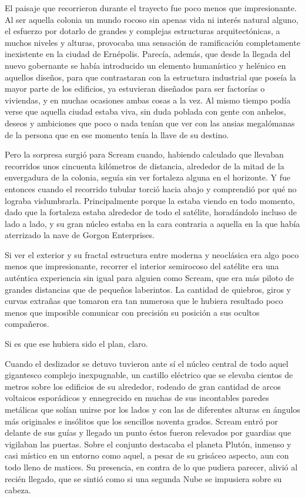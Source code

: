 El paisaje que recorrieron durante el trayecto fue poco menos que impresionante. Al ser aquella colonia un mundo rocoso sin apenas vida ni interés natural alguno, el esfuerzo por dotarlo de grandes y complejas estructuras arquitectónicas, a muchos niveles y alturas, provocaba una sensación de ramificación completamente inexistente en la ciudad de Ernépolis. Parecía, además, que desde la llegada del nuevo gobernante se había introducido un elemento humanístico y helénico en aquellos diseños, para que contrastaran con la estructura industrial que poseía la mayor parte de los edificios, ya estuvieran diseñados para ser factorías o viviendas, y en muchas ocasiones ambas cosas a la vez. Al mismo tiempo podía verse que aquella ciudad estaba viva, sin duda poblada con gente con anhelos, deseos y ambiciones que poco o nada tenían que ver con las ansias megalómanas de la persona que en ese momento tenía la llave de su destino.

Pero la sorpresa surgió para Scream cuando, habiendo calculado que llevaban recorridos unos cincuenta kilómetros de distancia, alrededor de la mitad de la envergadura de la colonia, seguía sin ver fortaleza alguna en el horizonte. Y fue entonces cuando el recorrido tubular torció hacia abajo y comprendió por qué no lograba vislumbrarla. Principalmente porque la estaba viendo en todo momento, dado que la fortaleza estaba alrededor de todo el satélite, horadándolo incluso de lado a lado, y su gran núcleo estaba en la cara contraria a aquella en la que había aterrizado la nave de Gorgon Enterprises.

Si ver el exterior y su fractal estructura entre moderna y neoclásica era algo poco menos que impresionante, recorrer el interior semirocoso del satélite era una auténtica experiencia sin igual para alguien como Scream, que era más piloto de grandes distancias que de pequeños laberintos. La cantidad de quiebros, giros y curvas extrañas que tomaron era tan numerosa que le hubiera resultado poco menos que imposible comunicar con precisión su posición a sus ocultos compañeros.

Si es que ese hubiera sido el plan, claro.

Cuando el deslizador se detuvo tuvieron ante sí el núcleo central de todo aquel gigantesco complejo inexpugnable, un castillo eléctrico que se elevaba cientos de metros sobre los edificios de su alrededor, rodeado de gran cantidad de arcos voltaicos esporádicos y ennegrecido en muchas de sus incontables paredes metálicas que solían unirse por los lados y con las de diferentes alturas en ángulos más originales e insólitos que los sencillos noventa grados. Scream entró por delante de sus guías y llegado un punto éstos fueron relevados por guardias que vigilaban las puertas. Sobre el conjunto destacaba el planeta Plutón, inmenso y casi místico en un entorno como aquel, a pesar de su grisáceo aspecto, aun con todo lleno de matices. Su presencia, en contra de lo que pudiera parecer, alivió al recién llegado, que se sintió como si una segunda Nube se impusiera sobre su cabeza.

